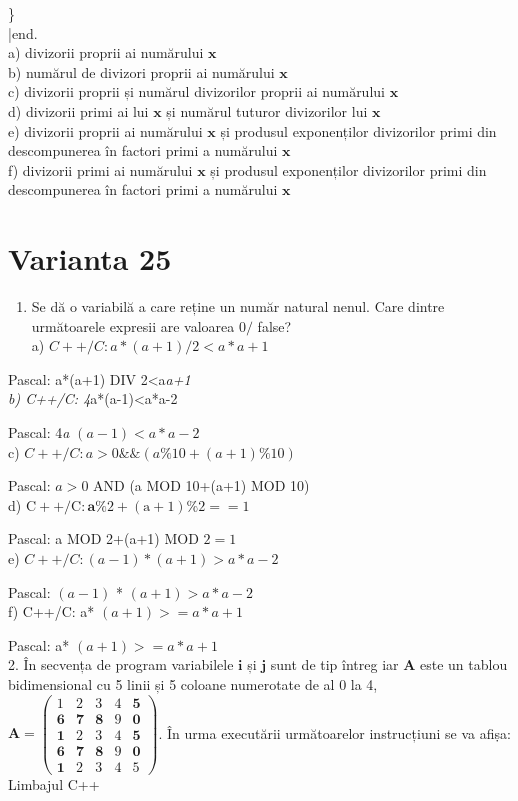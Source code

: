 \documentclass[10pt]{article}
\begin{document}
\}\\
|end.\\
a) divizorii proprii ai numărului $\mathbf{x}$\\
b) numărul de divizori proprii ai numărului $\mathbf{x}$\\
c) divizorii proprii și numărul divizorilor proprii ai numărului $\mathbf{x}$\\
d) divizorii primi ai lui $\mathbf{x}$ și numărul tuturor divizorilor lui $\mathbf{x}$\\
e) divizorii proprii ai numărului $\mathbf{x}$ și produsul exponenților divizorilor primi din descompunerea în factori primi a numărului $\mathbf{x}$\\
f) divizorii primi ai numărului $\mathbf{x}$ și produsul exponenților divizorilor primi din descompunerea în factori primi a numărului $\mathbf{x}$

\section*{Varianta 25}
\begin{enumerate}
  \item Se dă o variabilă a care reține un număr natural nenul. Care dintre următoarele expresii are valoarea $0 /$ false?\\
a) $C++/ C: a *(a+1) / 2<a * a+1$
\end{enumerate}

Pascal: a*(a+1) DIV 2<a\textit{a+1\\
b) C++/C: 4}a*(a-1)<a*a-2

Pascal: 4\textit{a} $(a-1)<a * a-2$\\
c) $C++/ C: a>0 \& \&(a \% 10+(a+1) \% 10)$

Pascal: $a>0$ AND (a MOD 10+(a+1) MOD 10)\\
d) $\mathrm{C}++/ \mathrm{C}: \mathbf{a} \% 2+(\mathrm{a}+1) \% 2==1$

Pascal: a MOD 2+(a+1) MOD $2=1$\\
e) $C++/ C:(a-1) *(a+1)>a * a-2$

Pascal: $(a-1)$ * $(a+1)>a * a-2$\\
f) C++/C: a* $(a+1)>=a * a+1$

Pascal: a* $(a+1)>=a * a+1$\\
2. În secvența de program variabilele $\mathbf{i}$ și $\mathbf{j}$ sunt de tip întreg iar $\mathbf{A}$ este un tablou bidimensional cu 5 linii și 5 coloane numerotate de al 0 la 4,\\
$\boldsymbol{A}=\left(\begin{array}{lllll}1 & 2 & 3 & 4 & \mathbf{5} \\ \mathbf{6} & \mathbf{7} & \mathbf{8} & 9 & \mathbf{0} \\ \mathbf{1} & 2 & 3 & 4 & \mathbf{5} \\ \mathbf{6} & \mathbf{7} & \mathbf{8} & 9 & \mathbf{0} \\ \mathbf{1} & 2 & 3 & 4 & 5\end{array}\right)$. În urma executării următoarelor instrucțiuni se va afiṣa:\\
Limbajul C++
\end{document}
